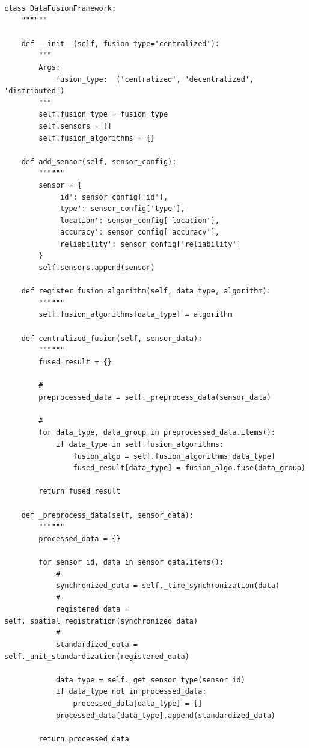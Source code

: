 \begin{lstlisting}[style=python]
class DataFusionFramework:
    """"""
    
    def __init__(self, fusion_type='centralized'):
        """
        Args:
            fusion_type:  ('centralized', 'decentralized', 'distributed')
        """
        self.fusion_type = fusion_type
        self.sensors = []
        self.fusion_algorithms = {}
        
    def add_sensor(self, sensor_config):
        """"""
        sensor = {
            'id': sensor_config['id'],
            'type': sensor_config['type'],
            'location': sensor_config['location'],
            'accuracy': sensor_config['accuracy'],
            'reliability': sensor_config['reliability']
        }
        self.sensors.append(sensor)
    
    def register_fusion_algorithm(self, data_type, algorithm):
        """"""
        self.fusion_algorithms[data_type] = algorithm
    
    def centralized_fusion(self, sensor_data):
        """"""
        fused_result = {}
        
        # 
        preprocessed_data = self._preprocess_data(sensor_data)
        
        # 
        for data_type, data_group in preprocessed_data.items():
            if data_type in self.fusion_algorithms:
                fusion_algo = self.fusion_algorithms[data_type]
                fused_result[data_type] = fusion_algo.fuse(data_group)
        
        return fused_result
    
    def _preprocess_data(self, sensor_data):
        """"""
        processed_data = {}
        
        for sensor_id, data in sensor_data.items():
            # 
            synchronized_data = self._time_synchronization(data)
            # 
            registered_data = self._spatial_registration(synchronized_data)
            # 
            standardized_data = self._unit_standardization(registered_data)
            
            data_type = self._get_sensor_type(sensor_id)
            if data_type not in processed_data:
                processed_data[data_type] = []
            processed_data[data_type].append(standardized_data)
        
        return processed_data
\end{lstlisting}

\hypertarget{section-94}{%
\subsubsection{}\label{section-94}}


